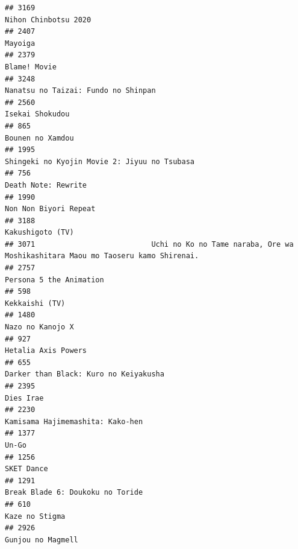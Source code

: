 \documentclass[
]{article}
\begin{document}
\begin{verbatim}
## 3169                                                                                      Nihon Chinbotsu 2020
## 2407                                                                                                   Mayoiga
## 2379                                                                                              Blame! Movie
## 3248                                                                       Nanatsu no Taizai: Fundo no Shinpan
## 2560                                                                                           Isekai Shokudou
## 865                                                                                           Bounen no Xamdou
## 1995                                                              Shingeki no Kyojin Movie 2: Jiyuu no Tsubasa
## 756                                                                                        Death Note: Rewrite
## 1990                                                                                     Non Non Biyori Repeat
## 3188                                                                                          Kakushigoto (TV)
## 3071                           Uchi no Ko no Tame naraba, Ore wa Moshikashitara Maou mo Taoseru kamo Shirenai.
## 2757                                                                                   Persona 5 the Animation
## 598                                                                                             Kekkaishi (TV)
## 1480                                                                                          Nazo no Kanojo X
## 927                                                                                        Hetalia Axis Powers
## 655                                                                      Darker than Black: Kuro no Keiyakusha
## 2395                                                                                                 Dies Irae
## 2230                                                                          Kamisama Hajimemashita: Kako-hen
## 1377                                                                                                     Un-Go
## 1256                                                                                                SKET Dance
## 1291                                                                          Break Blade 6: Doukoku no Toride
## 610                                                                                             Kaze no Stigma
## 2926                                                                                         Gunjou no Magmell

\end{verbatim}
\end{document}
